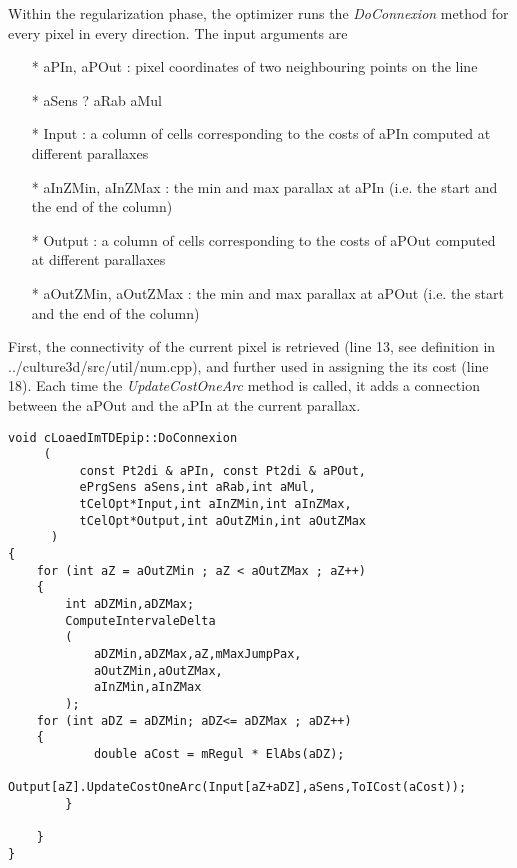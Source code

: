 \noindent Within the regularization phase, the optimizer runs the \emph{DoConnexion} method for every pixel in every direction. The input arguments are
\begin{itemize}
   \item[*] aPIn, aPOut : pixel coordinates of two neighbouring points on the line
   \item[*] aSens ? aRab aMul
   \item[*] Input : a column of cells corresponding to the costs of aPIn computed at different parallaxes
   \item[*] aInZMin, aInZMax : the min and max parallax at aPIn (i.e. the start and the end of the column)
   \item[*] Output : a column of cells corresponding to the costs of aPOut computed at different parallaxes
   \item[*] aOutZMin, aOutZMax : the min and max parallax at aPOut (i.e. the start and the end of the column)
\end{itemize}
First, the connectivity of the current pixel is retrieved (line 13, see definition in ../culture3d/src/util/num.cpp), and further used in assigning the its cost (line 18). Each time the \emph{UpdateCostOneArc} method is called, it adds a connection between the aPOut and the aPIn at the current parallax.




\begin{lstlisting}
void cLoaedImTDEpip::DoConnexion
     (
		  const Pt2di & aPIn, const Pt2di & aPOut,
		  ePrgSens aSens,int aRab,int aMul,
		  tCelOpt*Input,int aInZMin,int aInZMax,
		  tCelOpt*Output,int aOutZMin,int aOutZMax
      )
{
	for (int aZ = aOutZMin ; aZ < aOutZMax ; aZ++)
	{
		int aDZMin,aDZMax;
		ComputeIntervaleDelta
		(
		    aDZMin,aDZMax,aZ,mMaxJumpPax,
		    aOutZMin,aOutZMax,
		    aInZMin,aInZMax
		);
	for (int aDZ = aDZMin; aDZ<= aDZMax ; aDZ++)
	{
			double aCost = mRegul * ElAbs(aDZ);
			Output[aZ].UpdateCostOneArc(Input[aZ+aDZ],aSens,ToICost(aCost));
	    }

    }
}
\end{lstlisting}




